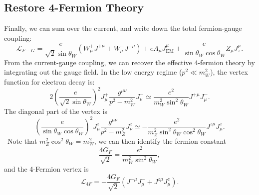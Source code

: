 \documentclass[aps,prb,superscriptaddress,nofootinbib]{revtex4}
\begin{document}
\subsection{Restore 4-Fermion Theory}
Finally, we can sum over the current, and write down the total fermion-gauge coupling:
\begin{equation}
	\mathcal L_{F-G} = \frac{e}{\sqrt{2}\sin{\theta_W}} \left(W^{+}_\mu J^{+\mu} + W^{-}_\mu J^{-\mu} \right) + e A_\mu J^{\mu}_{\mathrm{EM}} + \frac{e}{\sin{\theta_W}\cos{\theta_W}} Z_\mu J^\mu_{z}.
\end{equation}
From the current-gauge coupling, we can recover the effective 4-fermion theory by integrating out the gauge field.
In the low energy regime ($p^2 \ll m_W^2$), the vertex function for electron decay is:
\begin{equation}
	2\left(\frac{e}{\sqrt{2}\sin{\theta_W}} \right)^2 J^+_\mu \frac{g^{\mu\nu}}{p^2-m_W^2} J^-_\nu 
	\simeq \frac{e^2}{m_W^2 \sin^2{\theta_W}} J^{+\mu} J^-_\mu.
\end{equation}
The diagonal part of the vertex is
\begin{equation}
	\left(\frac{e}{\sin{\theta_W}\cos{\theta_W}} \right)^2 J^z_\mu \frac{g^{\mu\nu}}{p^2-m_Z^2} J^z_\nu 
	\simeq -\frac{e^2}{m_Z^2 \sin^2{\theta_W}\cos^2{\theta_W}} J^{z\mu} J^z_\mu.
\end{equation}\
Note that $m_Z^2\cos^2{\theta_W} = m_W^2$, we can then identify the fermion constant
\begin{equation}
	\frac{4G_F}{\sqrt 2} = \frac{e^2}{m_W^2 \sin^2{\theta_W}},
\end{equation}
and the 4-Fermion vertex is
\begin{equation}
	\mathcal L_{4F} = -\frac{4G_F}{\sqrt 2} \left(J^{+\mu} J_\mu^- + J^{z\mu} J_\mu^z \right).
\end{equation}
\end{document}
